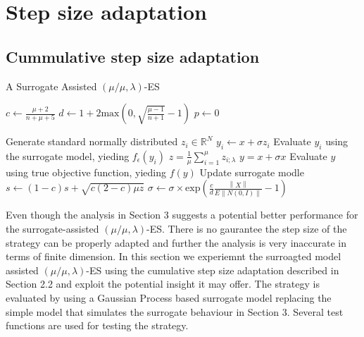 \section{Step size adaptation}

\subsection{Cummulative step size adaptation}

\begin{algorithm}
\caption{A Surrogate Assisted $(\mu/\mu,\lambda)$-ES}
\label{alg:mml-es}
\begin{algorithmic}[1]
\STATE $c \leftarrow  \frac{\mu +2}{n+\mu+5}$ 
\STATE $d \leftarrow 1 + 2 \text{max}(0, \sqrt{\frac{\mu - 1}{n+1} } - 1 ) $
\STATE $p \leftarrow 0$

		\STATE Generate standard normally distributed $z_i \in \mathbb{R}^N $
		\STATE $y_i \leftarrow x + \sigma z_i$
		\STATE Evaluate $y_i$ using the surrogate model, yieding $f_{\epsilon}(y_i)$
	\ENDFOR
	\STATE $z = \frac{1}{\mu} \sum_{i=1}^{\mu} z_{i;\lambda}$
	\STATE $y = x + \sigma x$
	\STATE Evaluate $y$ using true objective function, yieding $f(y)$
	\STATE Update surrogate modle 
	\STATE $s \leftarrow (1-c)s + \sqrt{ c(2-c) \mu z}$
	\STATE $\sigma \leftarrow \sigma \times \text{exp} \left(\frac{c}{d} \frac{\left\lVert X \right\rVert} { E \left\lVert N(0,I) \right\rVert} -1 \right )$
		

\ENDWHILE

\end{algorithmic}
\end{algorithm}

Even though the analysis in Section 3 suggests a potential better performance for the surrogate-assisted $(\mu/\mu,\lambda)$-ES. There is no gaurantee the step size of the strategy can be properly adapted and further the analysis is very inaccurate in terms of finite dimension. In this section we experiemnt the surroagted model assisted $(\mu/\mu,\lambda)$-ES using the cumulative step size adaptation described in Section 2.2 and exploit the potential insight it may offer. The strategy is evaluated by using a Gaussian Process based surrogate model replacing the simple model that simulates the surrogate behaviour in Section 3. Several test functions are used for testing the strategy.

